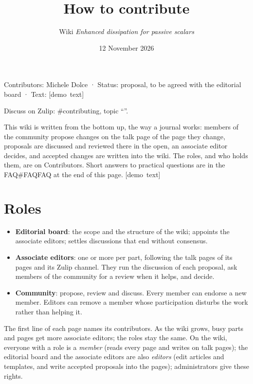 \documentclass[11pt]{article}
\makeatletter
\theoremstyle{definition}
\theoremstyle{remark}
\newcommand{\ed@label}[1]{\mbox{\footnotesize[#1]}}
\newcommand{\demo}[1]{\ed@label{demo text}}
\def\ed@title{}\let\ed@maketitle\maketitle\renewcommand{\maketitle}{\let\ed@title\@title\ed@maketitle}
\newcommand{\pagestatus}[1]{{\par\centering\small#1\par}}
\newcommand{\zulip}[2][]{{\par\centering\small Discuss on Zulip: \##2, topic
  ``\ifx\relax#1\relax\ed@title\else#1\fi''.\par}\medskip}
\newcommand{\wikilink}[2]{\ifx\relax#2\relax#1\else#2\fi}
\makeatother
\begin{document}
\title{How to contribute}
\author{Wiki \emph{Enhanced dissipation for passive scalars}}
\date{12 November 2026}
\maketitle
\pagestatus{Contributors: Michele Dolce · Status: proposal, to be agreed with the editorial board · Text: \demo{}}
\zulip{contributing}

This wiki is written from the bottom up, the way a journal works: members of the community propose changes on the talk page of the page they change, proposals are discussed and reviewed there in the open, an associate editor decides, and accepted changes are written into the wiki. The roles, and who holds them, are on \wikilink{Contributors}{}. Short answers to practical questions are in the \wikilink{\#FAQ}{FAQ} at the end of this page. \demo{}

\section{Roles}
\begin{itemize}
  \item \textbf{Editorial board}: the scope and the structure of the wiki; appoints the associate editors; settles discussions that end without consensus.
  \item \textbf{Associate editors}: one or more per part, following the talk pages of its pages and its Zulip channel. They run the discussion of each proposal, ask members of the community for a review when it helps, and decide.
  \item \textbf{Community}: propose, review and discuss. Every member can endorse a new member. Editors can remove a member whose participation disturbs the work rather than helping it.
\end{itemize}
The first line of each page names its contributors. As the wiki grows, busy parts and pages get more associate editors; the roles stay the same.
On the wiki, everyone with a role is a \emph{member} (reads every page and writes on talk pages); the editorial board and the associate editors are also \emph{editors} (edit articles and templates, and write accepted proposals into the pages); administrators give these rights.
\end{document}
